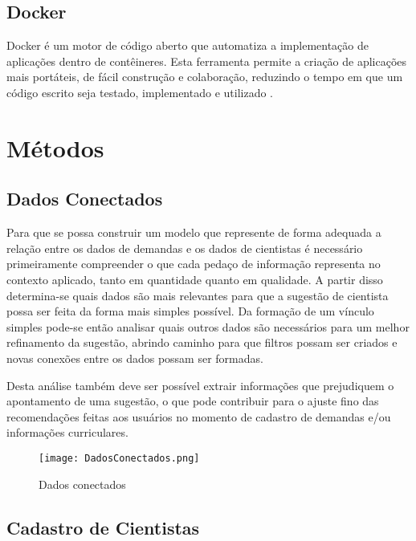 \subsection{Docker}\label{subsec:docker}

Docker é um motor de código aberto que automatiza a implementação de aplicações dentro de contêineres. Esta ferramenta permite a criação de aplicações mais portáteis, de fácil construção e colaboração, reduzindo o tempo em que um código escrito seja testado, implementado e utilizado \cite{TheDockerBook}.

\section{Métodos}\label{sec:metodo}

\subsection{Dados Conectados}\label{subsec:linkedData}

Para que se possa construir um modelo que represente de forma adequada a relação entre os dados de demandas e os dados de cientistas é necessário primeiramente compreender o que cada pedaço de informação representa no contexto aplicado, tanto em quantidade quanto em qualidade. A partir disso determina-se quais dados são mais relevantes para que a sugestão de cientista possa ser feita da forma mais simples possível. Da formação de um vínculo simples pode-se então analisar quais outros dados são necessários para um melhor refinamento da sugestão, abrindo caminho para que filtros possam ser criados e novas conexões entre os dados possam ser formadas.

Desta análise também deve ser possível extrair informações que prejudiquem o apontamento de uma sugestão, o que pode contribuir para o ajuste fino das recomendações feitas aos usuários no momento de cadastro de demandas e/ou informações curriculares.

\begin{figure}[htb]
    \caption{Dados conectados}
    \texttt{[image: DadosConectados.png]}
    \label{fig:dadosconectados}
\end{figure}

\subsection{Cadastro de Cientistas}\label{subsec:cadastro}

